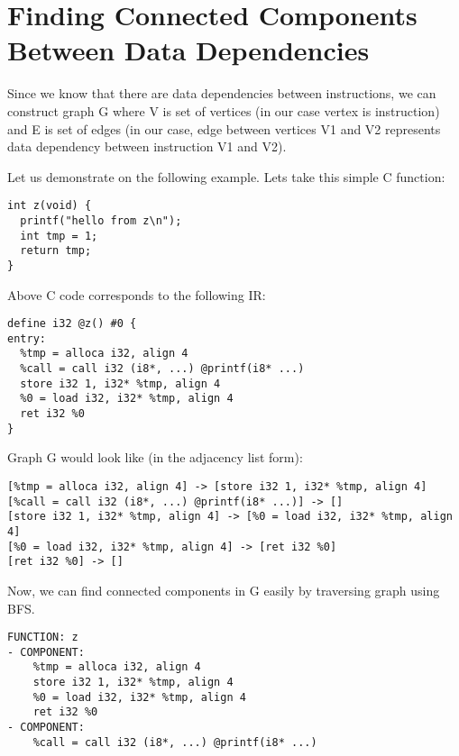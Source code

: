 \documentclass[12pt, twoside]{fithesis2}
\renewcommand{\_}{\leavevmode \kern0.07em\vbox{\hrule width0.4em}}
\begin{document}
\section{Finding Connected Components Between Data Dependencies}
\label{sec:design-components}


Since we know that there are data dependencies between instructions, we can
construct graph G where V is set of vertices (in our case vertex is
instruction) and E is set of edges (in our case, edge between vertices V1 and
V2 represents data dependency between instruction V1 and V2).

Let us demonstrate on the following example. Lets take this simple C function:

\begin{verbatim}
int z(void) {
  printf("hello from z\n");
  int tmp = 1;
  return tmp;
}
\end{verbatim}

Above C code corresponds to the following IR:

\begin{verbatim}
define i32 @z() #0 {
entry:
  %tmp = alloca i32, align 4
  %call = call i32 (i8*, ...) @printf(i8* ...)
  store i32 1, i32* %tmp, align 4
  %0 = load i32, i32* %tmp, align 4
  ret i32 %0
}
\end{verbatim}

Graph G would look like (in the adjacency list form):

\begin{verbatim}
[%tmp = alloca i32, align 4] -> [store i32 1, i32* %tmp, align 4]
[%call = call i32 (i8*, ...) @printf(i8* ...)] -> []
[store i32 1, i32* %tmp, align 4] -> [%0 = load i32, i32* %tmp, align 4]
[%0 = load i32, i32* %tmp, align 4] -> [ret i32 %0]
[ret i32 %0] -> []
\end{verbatim}

Now, we can find connected components in G easily by traversing graph using BFS.

\begin{verbatim}
FUNCTION: z
- COMPONENT:
    %tmp = alloca i32, align 4
    store i32 1, i32* %tmp, align 4
    %0 = load i32, i32* %tmp, align 4
    ret i32 %0
- COMPONENT:
    %call = call i32 (i8*, ...) @printf(i8* ...)
\end{verbatim}
\end{document}
